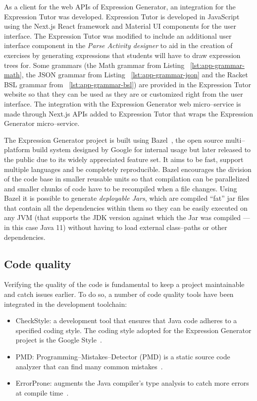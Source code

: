 \documentclass[]{usiinfbachelorproject}
\begin{document}
As a client for the web APIs of Expression Generator, an integration for
the Expression Tutor was developed.
Expression Tutor is developed in JavaScript using the Next.js React framework
and Material UI components for the user interface.
The Expression Tutor was modified to include an additional user interface
component in the \textit{Parse Activity designer} to aid in the creation of
exercises by generating expressions that students will have to draw expression
trees for. Some grammars (the Math grammar from Listing
~\ref{lst:app-grammar-math}, the JSON grammar from Listing
~\ref{lst:app-grammar-json} and the Racket BSL grammar from
~\ref{lst:app-grammar-bsl}) are provided in the Expression Tutor website so
that they can be used as they are or customized right from the user interface.
The integration with the Expression Generator web micro–service is made through
Next.js APIs added to Expression Tutor that wraps the Expression Generator
micro–service.

The Expression Generator project is built using Bazel~\cite{webbazel}, the
open source multi–platform build system designed by Google for internal usage
but later released to the public due to its widely appreciated feature set.
It aims to be fast, support multiple languages and be completely reproducible.
Bazel encourages the division of the code base in smaller reusable units so
that compilation can be parallelized and smaller chunks of code have to be
recompiled when a file changes.
Using Bazel it is possible to generate \textit{deployable Jars}, which are
compiled ``fat'' jar files that contain all the dependencies within them so
they can be easily executed on any JVM (that supports the JDK version against
which the Jar was compiled — in this case Java 11) without having to load
external class–paths or other dependencies.

\subsection{Code quality}\label{impl-quality}


Verifying the quality of the code is fundamental to keep a project maintainable
and catch issues earlier. To do so, a number of code quality tools have
been integrated in the development toolchain:

\begin{itemize}
\item CheckStyle: a development tool that ensures that Java code adheres to a
      specified coding style. The coding style adopted for the Expression
      Generator project is the Google Style~\cite{webcheckstyle}.
\item PMD\@: Programming–Mistakes–Detector (PMD) is a static source code
      analyzer that can find many common mistakes~\cite{webpmd}.
\item ErrorProne: augments the Java compiler's type analysis to catch more
      errors at compile time~\cite{weberrorprone}.
\end{itemize}
\end{document}
